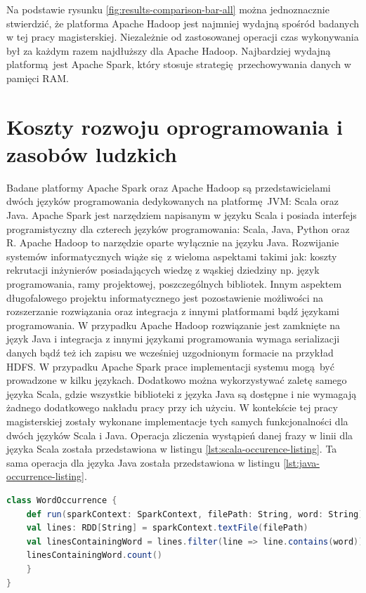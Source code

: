 Na podstawie rysunku \ref{fig:results-comparison-bar-all} można jednoznacznie stwierdzić, że platforma Apache Hadoop jest najmniej wydajną spośród badanych w tej pracy magisterskiej. Niezależnie od zastosowanej operacji czas wykonywania był za każdym razem najdłuższy dla Apache Hadoop. Najbardziej wydajną platformą jest Apache Spark, który stosuje strategię przechowywania danych w pamięci RAM.    
\section{Koszty rozwoju oprogramowania i zasobów ludzkich}\label{development_human_resources}
Badane platformy Apache Spark oraz Apache Hadoop są przedstawicielami dwóch języków programowania dedykowanych na platformę JVM: Scala oraz Java. Apache Spark jest narzędziem napisanym w języku Scala i posiada interfejs programistyczny dla czterech języków programowania: Scala, Java, Python oraz R. Apache Hadoop to narzędzie oparte wyłącznie na języku Java. Rozwijanie systemów informatycznych wiąże się z wieloma aspektami takimi jak: koszty rekrutacji inżynierów posiadających wiedzę z wąskiej dziedziny np. język programowania, ramy projektowej, poszczególnych bibliotek. Innym aspektem długofalowego projektu informatycznego jest pozostawienie możliwości na rozszerzanie rozwiązania oraz integracja z innymi platformami bądź językami programowania. W przypadku Apache Hadoop rozwiązanie jest zamknięte na język Java i integracja z innymi językami programowania wymaga serializacji danych bądź też ich zapisu we wcześniej uzgodnionym formacie na przykład HDFS. W przypadku Apache Spark prace implementacji systemu mogą być prowadzone w kilku językach. Dodatkowo można wykorzystywać zaletę samego języka Scala, gdzie wszystkie biblioteki z języka Java są dostępne i nie wymagają żadnego dodatkowego nakładu pracy przy ich użyciu. W kontekście tej pracy magisterskiej zostały wykonane implementacje tych samych funkcjonalności dla dwóch języków Scala i Java. Operacja zliczenia wystąpień danej frazy w linii dla języka Scala została przedstawiona w listingu \ref{lst:scala-occurence-listing}. Ta sama operacja dla języka Java została przedstawiona w listingu \ref{lst:java-occurrence-listing}.
\begin{lstlisting}[language=scala, caption={Operacja zliczania wystąpień danej frazy w linii dla języka Scala na platformie Apache Spark},captionpos=b, label={lst:scala-occurence-listing}]
class WordOccurrence {
	def run(sparkContext: SparkContext, filePath: String, word: String) = {
	val lines: RDD[String] = sparkContext.textFile(filePath)
	val linesContainingWord = lines.filter(line => line.contains(word))
	linesContainingWord.count()
	}
}
\end{lstlisting}
